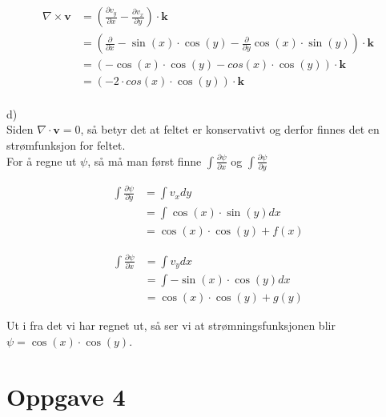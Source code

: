 \documentclass[12pt, a4paper]{article}
\begin{document}
\begin{equation}
    \begin{split}
        \nabla \times \textbf{v} &= (\frac{\partial v_y}{\partial x} - \frac{\partial v_x}{\partial y}) \cdot \textbf{k} \\
                                 &= (\frac{\partial}{\partial x} -\sin(x) \cdot \cos(y) - \frac{\partial}{\partial y} \cos(x) \cdot \sin(y)) \cdot \textbf{k} \\
                                 &= (-\cos(x) \cdot \cos(y) - cos(x) \cdot \cos(y)) \cdot \textbf{k} \\
                                 &= (-2 \cdot cos(x) \cdot \cos(y)) \cdot \textbf{k}
    \end{split}
\end{equation}
\\
d) \\
Siden $\nabla \cdot \textbf{v} = 0$, så betyr det at feltet er konservativt og derfor finnes det en strømfunksjon for feltet. \\
For å regne ut $\psi$, så må man først finne $\int \frac{\partial \psi}{\partial x}$ og $\int \frac{\partial \psi}{\partial y}$

\begin{equation}
    \begin{split}
        \int \frac{\partial \psi}{\partial y} &= \int v_x dy \\
                                              &= \int \cos(x) \cdot \sin(y) dx \\
                                              &= \cos(x) \cdot \cos(y) + f(x)
    \end{split}
\end{equation}

\begin{equation}
    \begin{split}
        \int \frac{\partial \psi}{\partial x} &= \int v_y dx \\
                                              &= \int -\sin(x) \cdot \cos(y) dx \\
                                              &= \cos(x) \cdot \cos(y) + g(y)
    \end{split}
\end{equation}

Ut i fra det vi har regnet ut, så ser vi at strømningsfunksjonen blir $\psi = \cos(x) \cdot \cos(y)$.



\newpage
\section*{Oppgave 4}
\end{document}
